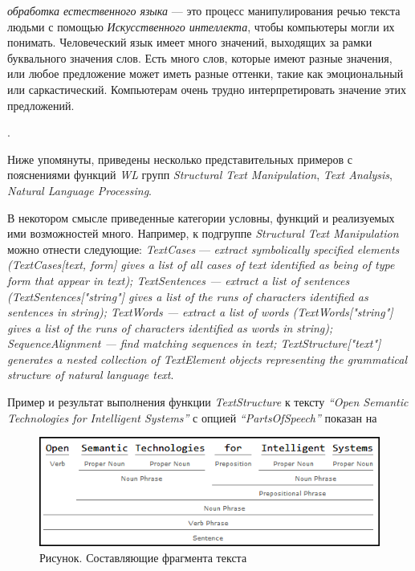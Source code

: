\textit{обработка естественного языка} --- это процесс манипулирования речью текста людьми с помощью \textit{Искусственного интеллекта}, чтобы компьютеры могли их понимать. 
Человеческий язык имеет много значений, выходящих за рамки буквального значения слов. Есть много слов, которые имеют разные значения, или любое предложение может иметь разные оттенки, такие как эмоциональный или саркастический. Компьютерам очень трудно интерпретировать значение этих предложений. 

.

Ниже упомянуты, приведены несколько представительных примеров с пояснениями функций \textit{WL} групп \textit{Structural Text Manipulation}, \textit{Text Analysis}, \textit{Natural Language Processing}. 

В некотором смысле приведенные категории условны, функций и реализуемых ими возможностей много. Например, к подгруппе \textit{Structural Text Manipulation} можно отнести следующие: 
\textit{TextCases} --- \textit{extract symbolically specified elements (TextCases[text, form] gives a list of all cases of text identified as being of type form that appear in text); TextSentences --- extract a list of sentences (TextSentences["string"] gives a list of the runs of characters identified as sentences in string); TextWords --- extract a list of words (TextWords["string"] gives a list of the runs of characters identified as words in string); SequenceAlignment --- find matching sequences in text; TextStructure["text"] generates a nested collection of TextElement objects representing the grammatical structure of natural language text}.

Пример и результат выполнения функции \textit{TextStructure} к тексту \textit{``Open Semantic Technologies for Intelligent Systems''} с опцией \textit{``PartsOfSpeech''} показан на \textit{}
\begin{figure}[H]
	\includegraphics[scale=0.8]{images/part7/chapter_integration/integr_alg4.png}
	\caption{Рисунок. Составляющие фрагмента текста}
	\label{fig:integr_alg4}
\end{figure}

